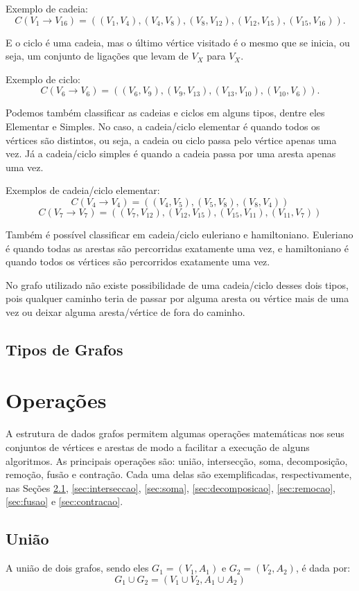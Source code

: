 \documentclass[
12pt,
a4paper,
semrecuonosumario,
sumario = abnt-6027-2012]{report}
\begin{document}
Exemplo de cadeia:
\[
C(V_1 \rightarrow V_{16}) = ((V_1,V_4),(V_4,V_8),(V_8,V_{12}),(V_{12},V_{15}),(V_{15},V_{16})).
\]

E o ciclo é uma cadeia, mas o último vértice visitado é o mesmo que se inicia, ou seja, um conjunto de ligações que levam de $V_X$ para $V_X$.

Exemplo de ciclo:
\[
C(V_6 \rightarrow V_6) = ((V_6,V_9),(V_9,V_{13}),(V_{13},V_{10}),(V_{10},V_6)).
\]

Podemos também classificar as cadeias e ciclos em alguns tipos, dentre eles Elementar e Simples.
No caso, a cadeia/ciclo elementar é quando todos os vértices são distintos, ou seja, a cadeia ou ciclo passa pelo vértice apenas uma vez.
Já a cadeia/ciclo simples é quando a cadeia passa por uma aresta apenas uma vez.

Exemplos de cadeia/ciclo elementar:
\[
C(V_4 \rightarrow V_4) = ((V_4,V_5),(V_5,V_8),(V_8,V_4))
\]
\[
C(V_7 \rightarrow V_7) = ((V_7,V_{12}),(V_{12},V_{15}),(V_{15},V_{11}),(V_{11},V_7))
\]

Também é possível classificar em cadeia/ciclo euleriano e hamiltoniano.
Euleriano é quando todas as arestas são percorridas exatamente uma vez, e hamiltoniano é quando todos os vértices são percorridos exatamente uma vez.

No grafo utilizado não existe possibilidade de uma cadeia/ciclo desses dois tipos, pois qualquer caminho teria de passar por alguma aresta ou vértice mais de uma vez ou deixar alguma aresta/vértice de fora do caminho.


	\section{Tipos de Grafos}\label{sec:tiposGrafos}


	\chapter{Operações}\label{cap:operacoes}

	A estrutura de dados grafos permitem algumas operações matemáticas nos seus conjuntos de vértices e arestas de modo a facilitar a execução de alguns algoritmos. As principais operações são: união, intersecção, soma, decomposição, remoção, fusão e contração. Cada uma delas são exemplificadas, respectivamente, nas Seções \ref{sec:uniao}, \ref{sec:interseccao}, \ref{sec:soma}, \ref{sec:decomposicao}, \ref{sec:remocao}, \ref{sec:fusao} e \ref{sec:contracao}.

	\section{União}\label{sec:uniao}
        A união de dois grafos, sendo eles $G_1 = (V_1, A_1)$ e $G_2 = (V_2, A_2)$, é dada por:
        \[
        G_1 \cup G_2 = (V_1 \cup V_2, A_1 \cup A_2)
        \]
\end{document}
